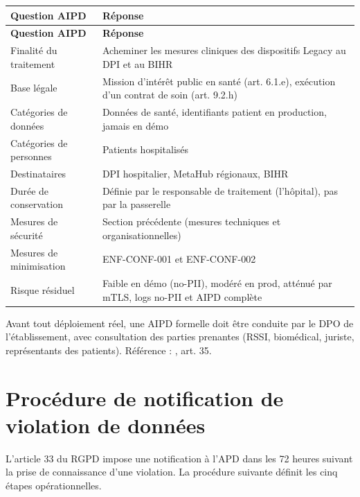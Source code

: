 \bridgezebra
\begin{longtable}{p{4.5cm}p{9.5cm}}
  \toprule
  \rowcolor{bridgeblue!90}
  {\color{white}\bfseries Question AIPD} & {\color{white}\bfseries Réponse} \\
  \midrule
  \endfirsthead
  \toprule
  \rowcolor{bridgeblue!90}
  {\color{white}\bfseries Question AIPD} & {\color{white}\bfseries Réponse} \\
  \midrule
  \endhead
  \bottomrule
  \endfoot
  Finalité du traitement    & Acheminer les mesures cliniques des dispositifs Legacy au DPI et au BIHR \\
  Base légale               & Mission d'intérêt public en santé (art. 6.1.e), exécution d'un contrat de soin (art. 9.2.h) \\
  Catégories de données     & Données de santé, identifiants patient en production, jamais en démo \\
  Catégories de personnes   & Patients hospitalisés \\
  Destinataires             & DPI hospitalier, MetaHub régionaux, BIHR \\
  Durée de conservation     & Définie par le responsable de traitement (l'hôpital), pas par la passerelle \\
  Mesures de sécurité       & Section précédente (mesures techniques et organisationnelles) \\
  Mesures de minimisation   & ENF-CONF-001 et ENF-CONF-002 \\
  Risque résiduel           & Faible en démo (no-PII), modéré en prod, atténué par mTLS, logs no-PII et AIPD complète \\
\end{longtable}

\begin{bridgewarn}
Avant tout déploiement réel, une AIPD formelle doit être conduite par le DPO de l'établissement, avec consultation des parties prenantes (RSSI, biomédical, juriste, représentants des patients). Référence : \cite{rgpd_2016_679}, art. 35.
\end{bridgewarn}

\section{Procédure de notification de violation de données}
\label{sec:securite-notification}

L'article 33 du RGPD impose une notification à l'APD dans les 72 heures suivant la prise de connaissance d'une violation. La procédure suivante définit les cinq étapes opérationnelles.

